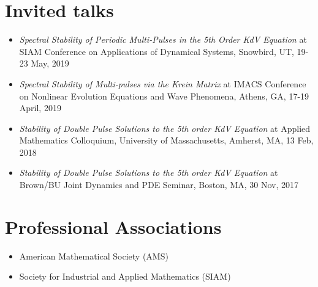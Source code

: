 \section*{Invited talks}

\begin{itemize}
	\item \emph{Spectral Stability of Periodic Multi-Pulses in the 5th Order KdV Equation} at SIAM Conference on Applications of Dynamical Systems, Snowbird, UT, 19-23 May, 2019
	\item \emph{Spectral Stability of Multi-pulses via the Krein Matrix} at IMACS Conference on Nonlinear Evolution Equations and Wave Phenomena, Athens, GA, 17-19 April, 2019
	\item \emph{Stability of Double Pulse Solutions to the 5th order KdV Equation} at Applied Mathematics Colloquium, University of Massachusetts, Amherst, MA, 13 Feb, 2018
	\item \emph{Stability of Double Pulse Solutions to the 5th order KdV Equation} at Brown/BU Joint Dynamics and PDE Seminar, Boston, MA, 30 Nov, 2017
\end{itemize}

\section*{Professional Associations}
\begin{itemize}
	\item American Mathematical Society (AMS)

	\item Society for Industrial and Applied Mathematics (SIAM)
\end{itemize}



